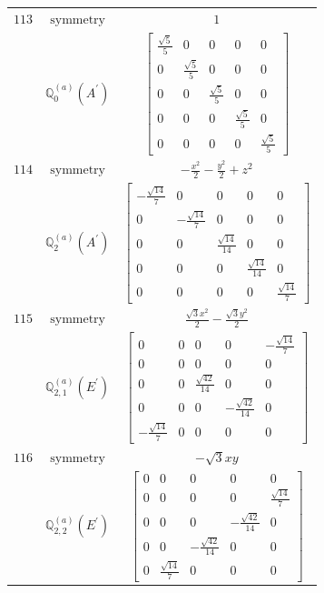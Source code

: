 \documentclass[fleqn,8pt,landscape]{jsarticle}
\begin{document}
\begin{longtable}{ccc}
$ 113 $ & $ \text{symmetry} $ & $ 1 $ \\
$  $ & $ \mathbb{Q}_{0}^{(a)}(A^{\prime}) $ & $ \begin{bmatrix} \frac{\sqrt{5}}{5} & 0 & 0 & 0 & 0 \\ 0 & \frac{\sqrt{5}}{5} & 0 & 0 & 0 \\ 0 & 0 & \frac{\sqrt{5}}{5} & 0 & 0 \\ 0 & 0 & 0 & \frac{\sqrt{5}}{5} & 0 \\ 0 & 0 & 0 & 0 & \frac{\sqrt{5}}{5} \end{bmatrix} $ \\ \hline
$ 114 $ & $ \text{symmetry} $ & $ - \frac{x^{2}}{2} - \frac{y^{2}}{2} + z^{2} $ \\
$  $ & $ \mathbb{Q}_{2}^{(a)}(A^{\prime}) $ & $ \begin{bmatrix} - \frac{\sqrt{14}}{7} & 0 & 0 & 0 & 0 \\ 0 & - \frac{\sqrt{14}}{7} & 0 & 0 & 0 \\ 0 & 0 & \frac{\sqrt{14}}{14} & 0 & 0 \\ 0 & 0 & 0 & \frac{\sqrt{14}}{14} & 0 \\ 0 & 0 & 0 & 0 & \frac{\sqrt{14}}{7} \end{bmatrix} $ \\ \hline
$ 115 $ & $ \text{symmetry} $ & $ \frac{\sqrt{3} x^{2}}{2} - \frac{\sqrt{3} y^{2}}{2} $ \\
$  $ & $ \mathbb{Q}_{2,1}^{(a)}(E^{\prime}) $ & $ \begin{bmatrix} 0 & 0 & 0 & 0 & - \frac{\sqrt{14}}{7} \\ 0 & 0 & 0 & 0 & 0 \\ 0 & 0 & \frac{\sqrt{42}}{14} & 0 & 0 \\ 0 & 0 & 0 & - \frac{\sqrt{42}}{14} & 0 \\ - \frac{\sqrt{14}}{7} & 0 & 0 & 0 & 0 \end{bmatrix} $ \\ \hline
$ 116 $ & $ \text{symmetry} $ & $ - \sqrt{3} x y $ \\
$  $ & $ \mathbb{Q}_{2,2}^{(a)}(E^{\prime}) $ & $ \begin{bmatrix} 0 & 0 & 0 & 0 & 0 \\ 0 & 0 & 0 & 0 & \frac{\sqrt{14}}{7} \\ 0 & 0 & 0 & - \frac{\sqrt{42}}{14} & 0 \\ 0 & 0 & - \frac{\sqrt{42}}{14} & 0 & 0 \\ 0 & \frac{\sqrt{14}}{7} & 0 & 0 & 0 \end{bmatrix} $ \\ \hline

\end{longtable}
\end{document}

